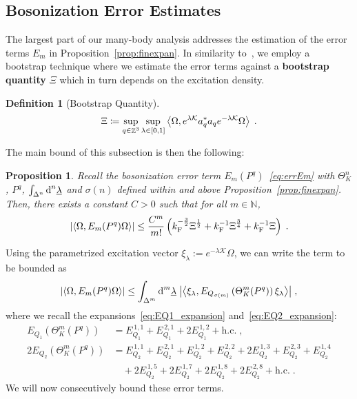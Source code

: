 \documentclass[12pt,a4paper]{article}
\numberwithin{equation}{section}
\newcommand{\cK}{\mathcal{K}}
\newcommand{\NNN}{\mathbb{N}}
\newcommand{\ulambda}{\underline{\lambda}}
\newcommand{\1}{\mathbb{I}}
\newcommand{\di}{\textnormal{d}}
\newcommand{\F}{\mathrm{F}}
\DeclareMathOperator{\Z}{\mathbb{Z}}
\newcommand{\half}{\frac{1}{2}}
\newcommand{\eva}[1]{\left\langle #1 \right\rangle}
\theoremstyle{plain}
\newtheorem{proposition}[theorem]{Proposition}
\theoremstyle{definition}
\newtheorem{definition}[theorem]{Definition}
\theoremstyle{remark}
\theoremstyle{plain}
\theoremstyle{definition}
\theoremstyle{remark}
\begin{document}
\subsection{Bosonization Error Estimates}
\label{subsec:bos_error}

The largest part of our many-body analysis addresses the estimation of the error terms $ E_m $ in Proposition~\ref{prop:finexpan}. In similarity to~\cite{BL25}, we employ a bootstrap technique where we estimate the error terms against a \textbf{bootstrap quantity} $ \Xi $ which in turn depends on the excitation density.

\begin{definition}[Bootstrap Quantity]
\begin{equation} \label{eq:Xi}
	\Xi \coloneq \sup\limits_{q \in \Z^3} \sup\limits_{\lambda \in [0,1]}\expval{\Omega, e^{\lambda \cK} a^*_q a_q e^{-\lambda \cK} \Omega} \;.
\end{equation}
\end{definition}

The main bound of this subsection is then the following:

\begin{proposition} \label{prop:finalEmest}
Recall the bosonization error term $E_m(P^q)$~\eqref{eq:errEm} with $ \Theta^n_K $, $ P^q $, $ \int_{\Delta^n} \di^n \ulambda $ and $ \sigma(n) $ defined within and above Proposition~\ref{prop:finexpan}. Then, there exists a constant $ C > 0 $ such that for all $ m \in \NNN $,
\begin{equation} \label{eq:finalEmest}
	\abs{\eva{\Omega, E_m(P^q) \Omega}}
	\leq \frac{C^m}{m!} \left( k_{\F}^{-\frac{3}{2}} \Xi^\half
		+ k_{\F}^{-1}\Xi^{\frac{3}{4}} + k_{\F}^{-1}\Xi \right) \;.
\end{equation}
\end{proposition}

Using the parametrized excitation vector $ \xi_\lambda := e^{- \lambda \cK} \Omega $, we can write the term to be bounded as
\begin{equation} \label{eq:errEm2}
	\abs{\eva{\Omega, E_m(P^q) \Omega }}
	\le \int_{\Delta^m} \di^m\underline{\lambda} \;
		\abs{\eva{\xi_\lambda, E_{Q_{\sigma(m)}}\left(\Theta^{m}_{K}(P^q)\right) \xi_\lambda}} \;,
\end{equation}
where we recall the expansions~\eqref{eq:EQ1_expansion} and~\eqref{eq:EQ2_expansion}:
\begin{align*}
	E_{Q_1}\left(\Theta^m_{K}(P^q)\right)&= E_{Q_1}^{\,1,1} +E_{Q_1}^{\,2,1} +2E_{Q_1}^{\,1,2}  + \mathrm{h.c.} \;,\\
	2E_{Q_2}\left(\Theta^m_{K}(P^q)\right)&= E_{Q_2}^{\,1,1} +E_{Q_2}^{\,2,1} + E_{Q_2}^{\,1,2} + E_{Q_2}^{\,2,2} +  2E_{Q_2}^{\,1,3} + E_{Q_2}^{\,2,3}+ E_{Q_2}^{\,1,4} \nonumber\\ &\quad+ 2E_{Q_2}^{\,1,5}+  2E_{Q_2}^{\,1,7} + 2E_{Q_2}^{\,1,8}+ 2E_{Q_2}^{\,2,8}+ \mathrm{h.c.} \;.
\end{align*}
We will now consecutively bound these error terms.
\end{document}
